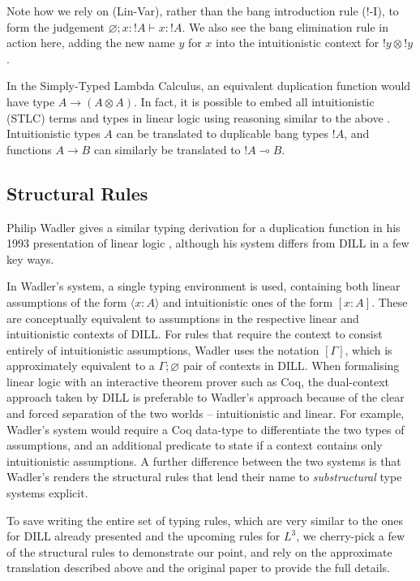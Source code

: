 \documentclass[]{unswthesis}
\let\emptyset\varnothing
\newcommand{\lolly}{\multimap}
\newcommand{\types}{\vdash}
\let\i\textit
\begin{document}
Note how we rely on (Lin-Var), rather than the bang introduction rule (!-I), to form the judgement $\emptyset; x : {!A} \types x : {!A}$. We also see the bang elimination rule in action here, adding the new name $y$ for $x$ into the intuitionistic context for ${!y} \otimes {!y}$.

In the Simply-Typed Lambda Calculus, an equivalent duplication function would have type $A \to (A \otimes A)$. In fact, it is possible to embed all intuitionistic (STLC) terms and types in linear logic using reasoning similar to the above \cite{barber96}. Intuitionistic types $A$ can be translated to duplicable bang types ${!A}$, and functions $A \to B$ can similarly be translated to ${!A} \lolly B$.

\subsection{Structural Rules}

Philip Wadler gives a similar typing derivation for a duplication function in his 1993 presentation of linear logic \cite{wadler93}, although his system differs from DILL in a few key ways.

In Wadler's system, a single typing environment is used, containing both linear assumptions of the form $\langle x : A \rangle$ and intuitionistic ones of the form $[x : A]$. These are conceptually equivalent to assumptions in the respective linear and intuitionistic contexts of DILL. For rules that require the context to consist entirely of intuitionistic assumptions, Wadler uses the notation $[\Gamma]$, which is approximately equivalent to a $\Gamma; \emptyset$ pair of contexts in DILL. When formalising linear logic with an interactive theorem prover such as Coq, the dual-context approach taken by DILL is preferable to Wadler's approach because of the clear and forced separation of the two worlds -- intuitionistic and linear. For example, Wadler's system would require a Coq data-type to differentiate the two types of assumptions, and an additional predicate to state if a context contains only intuitionistic assumptions. A further difference between the two systems is that Wadler's renders the structural rules that lend their name to \i{substructural} type systems explicit.

To save writing the entire set of typing rules, which are very similar to the ones for DILL already presented and the upcoming rules for $L^3$, we cherry-pick a few of the structural rules to demonstrate our point, and rely on the approximate translation described above and the original paper \cite{wadler93} to provide the full details.
\end{document}
